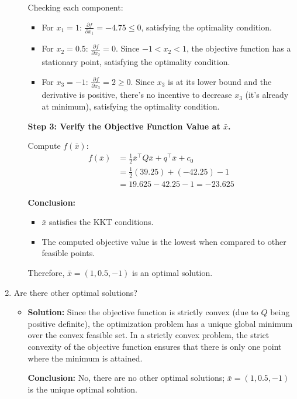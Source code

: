 \documentclass{article}
\begin{document}
\begin{enumerate}[label=(\alph*)]
\begin{itemize}
Checking each component:
\begin{itemize}
\item For $x_1 = 1$: $\frac{\partial f}{\partial x_1} = -4.75 \leq 0$, satisfying the optimality condition.
\item For $x_2 = 0.5$: $\frac{\partial f}{\partial x_2} = 0$. Since $-1 < x_2 < 1$, the objective function has a stationary point, satisfying the optimality condition.
\item For $x_3 = -1$: $\frac{\partial f}{\partial x_3} = 2 \geq 0$. Since $x_3$ is at its lower bound and the derivative is positive, there's no incentive to decrease $x_3$ (it's already at minimum), satisfying the optimality condition.
\end{itemize}

\textbf{Step 3: Verify the Objective Function Value at $\bar{x}$.}

Compute $f(\bar{x})$:
\begin{align*}
f(\bar{x}) &= \frac{1}{2} \bar{x}^\top Q \bar{x} + q^\top \bar{x} + c_0 \\
&= \frac{1}{2} (39.25) + (-42.25) - 1 \\
&= 19.625 - 42.25 - 1 = -23.625
\end{align*}

\textbf{Conclusion:}
\begin{itemize}
\item $\bar{x}$ satisfies the KKT conditions.
\item The computed objective value is the lowest when compared to other feasible points.
\end{itemize}

Therefore, $\bar{x} = (1, 0.5, -1)$ is an optimal solution.
\end{itemize}

\item Are there other optimal solutions?

\begin{itemize}
\item[] \textbf{Solution:}
Since the objective function is strictly convex (due to $Q$ being positive definite), the optimization problem has a unique global minimum over the convex feasible set. In a strictly convex problem, the strict convexity of the objective function ensures that there is only one point where the minimum is attained.

\textbf{Conclusion:} No, there are no other optimal solutions; $\bar{x} = (1, 0.5, -1)$ is the unique optimal solution.
\end{itemize}

\end{enumerate}
\end{document}
